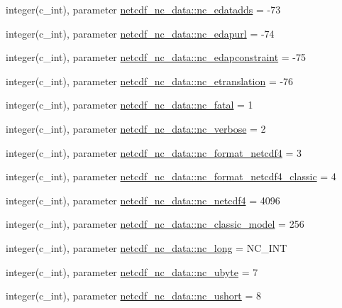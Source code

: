 \begin{DoxyCompactItemize}
\item 
integer(c\+\_\+int), parameter \hyperlink{namespacenetcdf__nc__data_ae8a1b8ebc79e1affd93b1ab2c1e837e5}{netcdf\+\_\+nc\+\_\+data\+::nc\+\_\+edatadds} = -\/73
\item 
integer(c\+\_\+int), parameter \hyperlink{namespacenetcdf__nc__data_a01d48838e19e0e70af483d025747f856}{netcdf\+\_\+nc\+\_\+data\+::nc\+\_\+edapurl} = -\/74
\item 
integer(c\+\_\+int), parameter \hyperlink{namespacenetcdf__nc__data_a5212aeb82d300b7974084d5fb0e5b189}{netcdf\+\_\+nc\+\_\+data\+::nc\+\_\+edapconstraint} = -\/75
\item 
integer(c\+\_\+int), parameter \hyperlink{namespacenetcdf__nc__data_a9dbf3b245bc3502ef973dd551acd3183}{netcdf\+\_\+nc\+\_\+data\+::nc\+\_\+etranslation} = -\/76
\item 
integer(c\+\_\+int), parameter \hyperlink{namespacenetcdf__nc__data_a218cdb0e85d508c9e7192433266f7840}{netcdf\+\_\+nc\+\_\+data\+::nc\+\_\+fatal} = 1
\item 
integer(c\+\_\+int), parameter \hyperlink{namespacenetcdf__nc__data_aade8a9185fed3dc8b83a2d53cf737cd2}{netcdf\+\_\+nc\+\_\+data\+::nc\+\_\+verbose} = 2
\item 
integer(c\+\_\+int), parameter \hyperlink{namespacenetcdf__nc__data_a6e6fb575674b407ce4bcbd8a3fbfaafb}{netcdf\+\_\+nc\+\_\+data\+::nc\+\_\+format\+\_\+netcdf4} = 3
\item 
integer(c\+\_\+int), parameter \hyperlink{namespacenetcdf__nc__data_a60373f746d74c3f38dea911721c5f595}{netcdf\+\_\+nc\+\_\+data\+::nc\+\_\+format\+\_\+netcdf4\+\_\+classic} = 4
\item 
integer(c\+\_\+int), parameter \hyperlink{namespacenetcdf__nc__data_a4c1ef05022dd5f1fcafdc0e9b792c41f}{netcdf\+\_\+nc\+\_\+data\+::nc\+\_\+netcdf4} = 4096
\item 
integer(c\+\_\+int), parameter \hyperlink{namespacenetcdf__nc__data_ad4978ab1f7dd98f92d2309a693d05c9b}{netcdf\+\_\+nc\+\_\+data\+::nc\+\_\+classic\+\_\+model} = 256
\item 
integer(c\+\_\+int), parameter \hyperlink{namespacenetcdf__nc__data_ac468d6357db55a39f2d9073faf2e48bd}{netcdf\+\_\+nc\+\_\+data\+::nc\+\_\+long} = N\+C\+\_\+\+I\+NT
\item 
integer(c\+\_\+int), parameter \hyperlink{namespacenetcdf__nc__data_a25ec71612dbd26d484a4974fe4f17ed0}{netcdf\+\_\+nc\+\_\+data\+::nc\+\_\+ubyte} = 7
\item 
integer(c\+\_\+int), parameter \hyperlink{namespacenetcdf__nc__data_a78be4744628e5b0e6599cb681fa4c050}{netcdf\+\_\+nc\+\_\+data\+::nc\+\_\+ushort} = 8

\end{DoxyCompactItemize}
